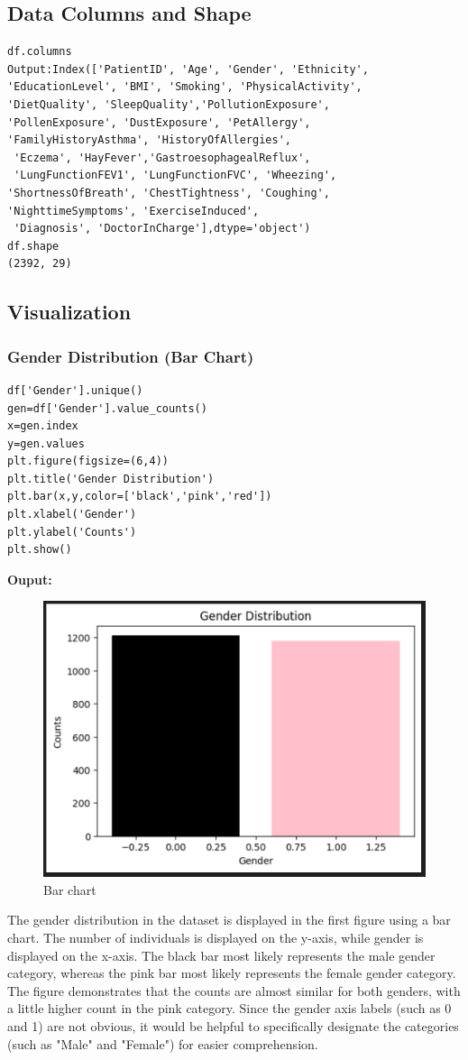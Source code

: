 \subsection{Data Columns and Shape}
\begin{verbatim}
df.columns
Output:Index(['PatientID', 'Age', 'Gender', 'Ethnicity', 
'EducationLevel', 'BMI', 'Smoking', 'PhysicalActivity', 
'DietQuality', 'SleepQuality','PollutionExposure', 
'PollenExposure', 'DustExposure', 'PetAllergy',
'FamilyHistoryAsthma', 'HistoryOfAllergies',
 'Eczema', 'HayFever','GastroesophagealReflux',
 'LungFunctionFEV1', 'LungFunctionFVC', 'Wheezing', 
'ShortnessOfBreath', 'ChestTightness', 'Coughing',
'NighttimeSymptoms', 'ExerciseInduced',
 'Diagnosis', 'DoctorInCharge'],dtype='object')
df.shape
(2392, 29)
\end{verbatim}
\subsection{Visualization}
\subsubsection{Gender Distribution (Bar Chart)}
\begin{verbatim}
df['Gender'].unique()
gen=df['Gender'].value_counts()
x=gen.index
y=gen.values
plt.figure(figsize=(6,4))
plt.title('Gender Distribution')
plt.bar(x,y,color=['black','pink','red'])
plt.xlabel('Gender')
plt.ylabel('Counts')
plt.show()
\end{verbatim}

\textbf{Ouput:}
\begin{figure}[h]
\centering
\includegraphics[width=0.7\linewidth]{Images/1.png}
\caption{Bar chart}
\label{fig:enter-label}
\end{figure}
The gender distribution in the dataset is displayed in the first figure using a bar chart. The number of individuals is displayed on the y-axis, while gender is displayed on the x-axis. The black bar most likely represents the male gender category, whereas the pink bar most likely represents the female gender category. The figure demonstrates that the counts are almost similar for both genders, with a little higher count in the pink category. Since the gender axis labels (such as 0 and 1) are not obvious, it would be helpful to specifically designate the categories (such as "Male" and "Female") for easier comprehension.

